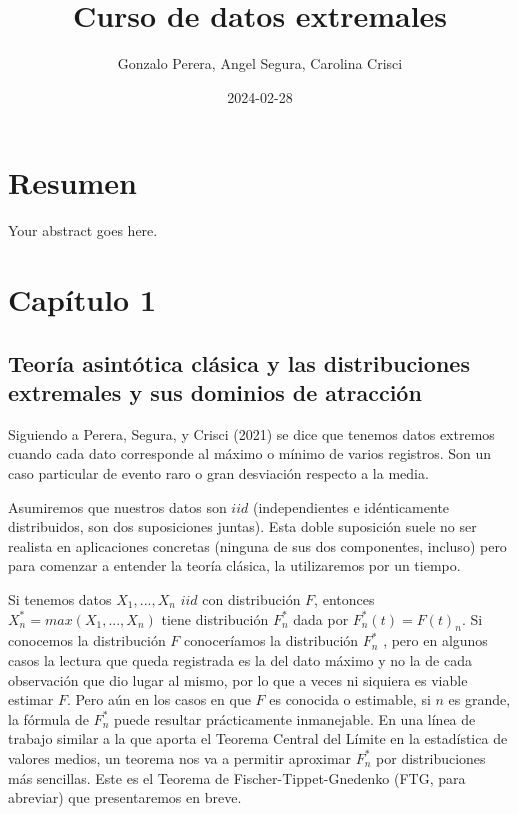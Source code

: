 \documentclass[
  oneside]{book}
\title{Curso de datos extremales}
\author{Gonzalo Perera, Angel Segura, Carolina Crisci}
\date{2024-02-28}
\begin{document}
\frontmatter
\maketitle

\mainmatter
\newpage

\thispagestyle{empty}

\maketitle

\newpage

\tableofcontents

\newpage

\hypertarget{resumen}{%
\chapter{Resumen}\label{resumen}}

Your abstract goes here.

\chapter{Capítulo 1}
\section{Teoría asintótica clásica y las distribuciones extremales y sus dominios de atracción}

Siguiendo a Perera, Segura, y Crisci (2021) se dice que tenemos datos
extremos cuando cada dato corresponde al máximo o mínimo de varios
registros. Son un caso particular de evento raro o gran desviación
respecto a la media.

Asumiremos que nuestros datos son \(iid\) (independientes e
idénticamente distribuidos, son dos suposiciones juntas). Esta doble
suposición suele no ser realista en aplicaciones concretas (ninguna de
sus dos componentes, incluso) pero para comenzar a entender la teoría
clásica, la utilizaremos por un tiempo.

Si tenemos datos \(X_1,...,X_n\) \(iid\) con distribución \(F\),
entonces \(X_n^* = max (X_1,...,X_n)\) tiene distribución \(F_n^*\) dada
por \(F_n^* (t)= F(t)_n\). Si conocemos la distribución \(F\)
conoceríamos la distribución \(F_n^*\) , pero en algunos casos la
lectura que queda registrada es la del dato máximo y no la de cada
observación que dio lugar al mismo, por lo que a veces ni siquiera es
viable estimar \(F\). Pero aún en los casos en que \(F\) es conocida o
estimable, si \(n\) es grande, la fórmula de \(F_n^*\) puede resultar
prácticamente inmanejable. En una línea de trabajo similar a la que
aporta el Teorema Central del Límite en la estadística de valores
medios, un teorema nos va a permitir aproximar \(F_n^*\) por
distribuciones más sencillas. Este es el Teorema de
Fischer-Tippet-Gnedenko (FTG, para abreviar) que presentaremos en breve.
\end{document}
